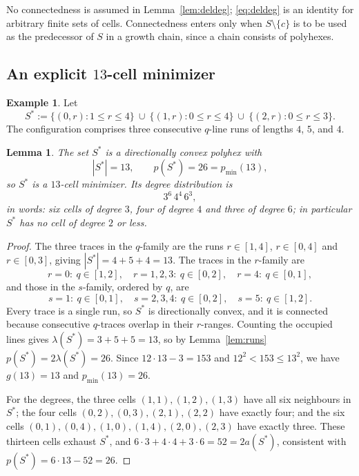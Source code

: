 \documentclass[11pt]{article}
\theoremstyle{plain}
\newtheorem{lemma}[theorem]{Lemma}
\theoremstyle{definition}
\newtheorem{example}[theorem]{Example}
\theoremstyle{remark}
\newcommand{\sm}{\setminus}
\begin{document}
No connectedness is assumed in Lemma~\ref{lem:deldeg}; \eqref{eq:deldeg} is an identity for
arbitrary finite sets of cells. Connectedness enters only when \(S\sm\{c\}\) is to be used
as the predecessor of \(S\) in a growth chain, since a chain consists of polyhexes.

\subsection{An explicit \texorpdfstring{\(13\)}{13}-cell minimizer}\label{sec:8.2}

\begin{example}\label{ex:13}
Let
\[
   S^{\ast}:=\{(0,r):1\le r\le4\}\ \cup\ \{(1,r):0\le r\le4\}\ \cup\ \{(2,r):0\le r\le3\} .
\]
The configuration comprises three consecutive \(q\)-line runs of lengths \(4\), \(5\), and \(4\).
\end{example}

\begin{lemma}\label{lem:13min}
The set \(S^{\ast}\) is a directionally convex polyhex with
\[
   |S^{\ast}|=13,\qquad p(S^{\ast})=26=p_{\min}(13),
\]
so \(S^{\ast}\) is a \(13\)-cell minimizer. Its degree distribution is
\[
   3^{6}\,4^{4}\,6^{3},
\]
in words: six cells of degree \(3\), four of degree \(4\) and three of degree \(6\); in
particular \(S^{\ast}\) has no cell of degree \(2\) or less.
\end{lemma}

\begin{proof}
The three traces in the \(q\)-family are the runs \(r\in[1,4]\), \(r\in[0,4]\) and
\(r\in[0,3]\), giving \(|S^{\ast}|=4+5+4=13\). The traces in the \(r\)-family are
\[
   r=0:\ q\in[1,2],\quad r=1,2,3:\ q\in[0,2],\quad r=4:\ q\in[0,1],
\]
and those in the \(s\)-family, ordered by \(q\), are
\[
   s=1:\ q\in[0,1],\quad s=2,3,4:\ q\in[0,2],\quad s=5:\ q\in[1,2].
\]
Every trace is a single run, so \(S^{\ast}\) is directionally convex, and it is connected
because consecutive \(q\)-traces overlap in their \(r\)-ranges. Counting the occupied lines
gives \(\lambda(S^{\ast})=3+5+5=13\), so by Lemma~\ref{lem:runs}
\(p(S^{\ast})=2\lambda(S^{\ast})=26\). Since \(12\cdot13-3=153\) and
\(12^{2}<153\le13^{2}\), we have \(g(13)=13\) and \(p_{\min}(13)=26\).

For the degrees, the three cells \((1,1),(1,2),(1,3)\) have all six neighbours in
\(S^{\ast}\); the four cells \((0,2),(0,3),(2,1),(2,2)\) have exactly four; and the six
cells \((0,1),(0,4),(1,0),(1,4),(2,0),(2,3)\) have exactly three. These thirteen cells
exhaust \(S^{\ast}\), and \(6\cdot3+4\cdot4+3\cdot6=52=2a(S^{\ast})\), consistent with
\(p(S^{\ast})=6\cdot13-52=26\).
\end{proof}
\end{document}
